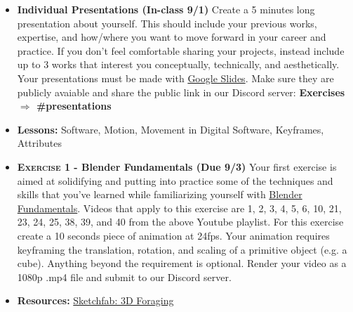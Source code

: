\def\dMon{1/25}%
\def\dTues{1/26}%
\def\dWed{1/27}%
\def\dThur{1/28}%
\placeDate

\def\tues{9/1}%
\def\thur{9/3}%
% 
\begin{itemize}[noitemsep,topsep=0pt,leftmargin=*]
    \item \textbf{Individual Presentations (In-class \tues)} Create a 5 minutes long presentation about yourself. This should include your previous works, expertise, and how/where you want to move forward in your career and practice. If you don't feel comfortable sharing your projects, instead include up to 3 works that interest you conceptually, technically, and aesthetically. Your presentations must be made with \href{https://docs.google.com/presentation/}{Google Slides}. Make sure they are publicly avaiable and share the public link in our Discord server: \textbf{Exercises $\Rightarrow$ \#presentations}
\end{itemize}
\vspace{1em}
\begin{itemize}[noitemsep,topsep=0pt,leftmargin=*]
    \item \textbf{Lessons:} Software, Motion, Movement in Digital Software, Keyframes, Attributes
    \item \textbf{\textsc{Exercise 1} - Blender Fundamentals (Due \thur)} Your first exercise is aimed at solidifying and putting into practice some of the techniques and skills that you've learned while familiarizing yourself with \href{https://www.youtube.com/playlist?list=PLa1F2ddGya_-UvuAqHAksYnB0qL9yWDO6}{Blender Fundamentals}. Videos that apply to this exercise are 1, 2, 3, 4, 5, 6, 10, 21, 23, 24, 25, 38, 39, and 40 from the above Youtube playlist. For this exercise create a 10 seconds piece of animation at 24fps. Your animation requires keyframing the translation, rotation, and scaling of a primitive object (e.g. a cube). Anything beyond the requirement is optional. Render your video as a 1080p .mp4 file and submit to our Discord server.
    \item \textbf{Resources:} \href{https://sketchfab.com/search?features\=downloadable\&q\=scan+heritage\&sort\_by\=-relevance\&type\=models}{Sketchfab: 3D Foraging}
\end{itemize}